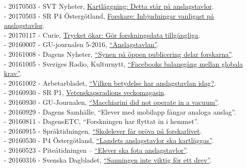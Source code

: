 \documentclass[a4paper,11pt,oneside]{article}
\begin{document}
    - 20170503 - SVT Nyheter, \href{https://www.svt.se/nyheter/lokalt/vast/elever-har-kartlagt-anslagstavlor-i-hela-landet}{Kartläggning: Detta står på anslagstavlor}. \\
    - 20170503 - SR P4 Östergötland, \href{http://t.sr.se/2pdhEBb}{Forskare: Inbjudningar vanligast på anslagstavlor}.\\
    - 20170117 - Curie, \href{http://www.tidningencurie.se/nyheter/2017/01/17/trycket-okar-gor-forskningsdata-tillgangliga/}{Trycket ökar: Gör forskningsdata tillgängliga}.\\
    - 20160007 - GU-journalen 5-2016, \href{https://issuu.com/universityofgothenburg/docs/gu-journalen5-2016/34}{``Anslagstavlan''}.\\
    - 20161008 - Dagens Nyheter, \href{http://www.dn.se/nyheter/sverige/synen-pa-oppen-publicering-delar-forskarna/}{``Synen på öppen publicering delar forskarna''}.\\
    - 20161005 - Sveriges Radio, Kulturnytt, \href{http://sverigesradio.se/sida/artikel.aspx?programid=478&artikel=6533649}{``Facebooks balansgång mellan globala krav''}.\\
    - 20161002 - Arbetarbladet, \href{http://www.arbetarbladet.se/gavleborg/sandviken/vilken-betydelse-har-anslagstavlan-i-dag}{``Vilken betydelse har anslagstavlan idag?}.\\
    - 20160930 - SR P1, \href{http://t.sr.se/2dszL0a}{Vetenskapsradions veckomagasin}.\\
    - 20160930 - GU-Journalen, \href{https://issuu.com/universityofgothenburg/docs/guj4-2016}{``Macchiarini did not operate in a vacuum''}.\\
    - 20160929 - Dagens Samhälle, ``Elever med mobilapp fångar analoga anslag''.\\
    - 20160811 - DagensETC, ``Forskningen har flyttat in i hemmet''. \\
    - 20160915 - Språktidningen, \href{http://spraktidningen.se/blogg/skolelever-far-prova-pa-forskarlivet}{``Skolelever får pröva på forskarlivet}.\\
    - 20160530 - P4 Östergötland, \href{http://t.sr.se/1NY9nMZ}{``Landets anslagstavlor ska kartläggas''}. \\
    - 20160523 - Piteåtidningen – \href{http://www.pt.se/nyheter/pitea/elever-ska-fota-anslagstavlor-10045575.aspx}{``Elever ska fota anslagstavlor''}. \\
    - 20160316 - Svenska Dagbladet, \href{http://www.svd.se/sanning-inte-viktigt-for-ett-drev/om/natdrev}{``Sanningen inte viktig för ett drev''}. \\
\end{document}
